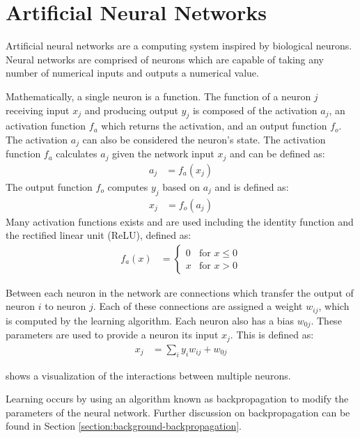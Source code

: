\section{Artificial Neural Networks}
Artificial neural networks are a computing system inspired by biological neurons. Neural networks are comprised of neurons which are capable of taking any number of numerical inputs and outputs a numerical value.



Mathematically, a single neuron is a function.
The function of a neuron $j$ receiving input $x_j$ and producing output $y_j$ is composed of the activation $a_j$, an activation function $f_a$ which returns the activation, and an output function $f_{o}$.
The activation $a_j$ can also be considered the neuron's state.
The activation function $f_a$ calculates $a_j$ given the network input $x_j$ and can be defined as:
\begin{align}
	a_j &= f_a\left(x_j\right)
\end{align}
The output function $f_o$ computes $y_j$ based on $a_j$ and is defined as:
\begin{align}
	x_j &= f_o\left(a_j\right)
\end{align}
Many activation functions exists and are used including the identity function and the rectified linear unit (ReLU), defined as:
\begin{align}
	f_a(x) &= 
	\begin{cases}
		0	& \text{for } x \leq 0\\
		x	& \text{for } x > 0
	\end{cases}
\end{align}

Between each neuron in the network are connections which transfer the output of neuron $i$ to neuron $j$. Each of these connections are assigned a weight $w_{ij}$, which is computed by the learning algorithm.
Each neuron also has a bias $w_{0j}$.
These parameters are used to provide a neuron its input $x_j$. This is defined as:
\begin{align}
	x_j &= \sum_{i}y_iw_{ij} + w_{0j}
\end{align}

 shows a visualization of the interactions between multiple neurons.

Learning occurs by using an algorithm known as backpropagation to modify the parameters of the neural network.
Further discussion on backpropagation can be found in Section \ref{section:background-backpropagation}.

